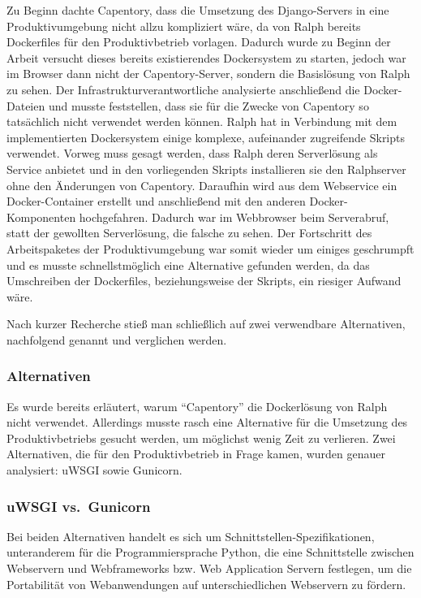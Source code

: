Zu Beginn dachte Capentory, dass die Umsetzung des Django-Servers in
eine Produktivumgebung nicht allzu kompliziert wäre, da von Ralph
bereits Dockerfiles für den Produktivbetrieb vorlagen. Dadurch wurde zu
Beginn der Arbeit versucht dieses bereits existierendes Dockersystem zu
starten, jedoch war im Browser dann nicht der Capentory-Server, sondern
die Basislösung von Ralph zu sehen. Der Infrastrukturverantwortliche
analysierte anschließend die Docker-Dateien und musste feststellen, dass
sie für die Zwecke von Capentory so tatsächlich nicht verwendet werden
können. Ralph hat in Verbindung mit dem implementierten Dockersystem
einige komplexe, aufeinander zugreifende Skripts verwendet. Vorweg muss
gesagt werden, dass Ralph deren Serverlösung als Service anbietet und in
den vorliegenden Skripts installieren sie den Ralphserver ohne den
Änderungen von Capentory. Daraufhin wird aus dem Webservice ein
Docker-Container erstellt und anschließend mit den anderen
Docker-Komponenten hochgefahren. Dadurch war im Webbrowser beim
Serverabruf, statt der gewollten Serverlösung, die falsche zu sehen. Der
Fortschritt des Arbeitspaketes der Produktivumgebung war somit wieder um
einiges geschrumpft und es musste schnellstmöglich eine Alternative
gefunden werden, da das Umschreiben der Dockerfiles, beziehungsweise der
Skripts, ein riesiger Aufwand wäre.

Nach kurzer Recherche stieß man schließlich auf zwei verwendbare
Alternativen, nachfolgend genannt und verglichen werden.

\hypertarget{alternativen}{%
\subsubsection{Alternativen}\label{alternativen}}

Es wurde bereits erläutert, warum ``Capentory'' die Dockerlösung von
Ralph nicht verwendet.  Allerdings
musste rasch eine Alternative für die Umsetzung des Produktivbetriebs
gesucht werden, um möglichst wenig Zeit zu verlieren. Zwei Alternativen,
die für den Produktivbetrieb in Frage kamen, wurden genauer analysiert:
uWSGI sowie Gunicorn.

\hypertarget{uwsgi-vs.-gunicorn}{%
\subsubsection{uWSGI vs.~Gunicorn}\label{uwsgi-vs.-gunicorn}}

Bei beiden Alternativen handelt es sich um
Schnittstellen-Spezifikationen, unteranderem für die Programmiersprache
Python, die eine Schnittstelle zwischen Webservern und Webframeworks
bzw. Web Application Servern festlegen, um die Portabilität von
Webanwendungen auf unterschiedlichen Webservern zu fördern.

